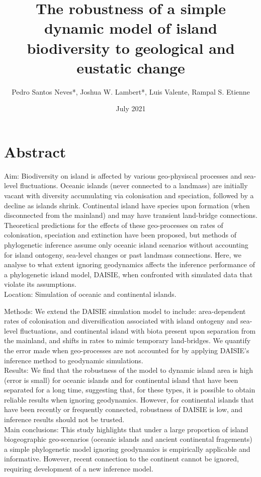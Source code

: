 \documentclass{article}
\title{The robustness of a simple dynamic model of island biodiversity to geological and eustatic change}
\author{Pedro Santos Neves*, Joshua W. Lambert*, Luis Valente, Rampal S. Etienne}
\date{July 2021}
\begin{document}
\maketitle

\section*{Abstract}

Aim: Biodiversity on island is affected by various geo-physiscal processes and sea-level fluctuations. Oceanic islands (never connected to a landmass) are initially vacant with diversity accumulating via colonisation and speciation, followed by a decline as islands shrink. Continental island have species upon formation (when disconnected from the mainland) and may have transient land-bridge connections. Theoretical predictions for the effects of these geo-processes on rates of colonisation, speciation and extinction have been proposed, but methods of phylogenetic inference assume only oceanic island scenarios without accounting for island ontogeny, sea-level changes or past landmass connections. Here, we analyse to what extent ignoring geodynamics affects the inference performance of a phylogenetic island model, DAISIE, when confronted with simulated data that violate its assumptions. \\

Location: Simulation of oceanic and continental islands.

Methods: We extend the DAISIE simulation model to include: area-dependent rates of colonisation and diversification associated with island ontogeny and sea-level fluctuations, and continental island with biota present upon separation from the mainland, and shifts in rates to mimic temporary land-bridges. We quantify the error made when geo-processes are not accounted for by applying DAISIE's inference method to geodynamic simulations. \\

Results: We find that the robustness of the model to dynamic island area is high (error is small) for oceanic islands and for continental island that have been separated for a long time, suggesting that, for these types, it is possible to obtain reliable results when ignoring geodynamics. However, for continental islands that have been recently or frequently connected, robustness of DAISIE is low, and inference results should not be trusted. \\

Main conclusions: This study highlights that under a large proportion of island biogeographic geo-scenarios (oceanic islands and ancient continental fragements) a simple phylogenetic model ignoring geodynamics is empirically applicable and informative. However, recent connection to the continent cannot be ignored, requiring development of a new inference model. \\
\end{document}
